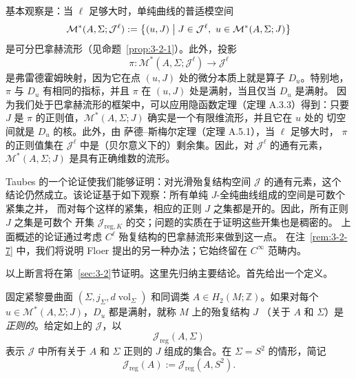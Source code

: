 基本观察是：当 $\ell$ 足够大时，单纯曲线的普适模空间
\[
  \mathcal M^*(A,\Sigma;\mathcal J^\ell)
  :=\bigl\{(u,J)\bigm|
  J\in\mathcal J^\ell,\ u\in\mathcal M^*(A,\Sigma;J)\bigr\}
\]
是可分巴拿赫流形（见命题~\ref{prop:3-2-1}）。此外，投影
\[
  \pi:\mathcal M^*(A,\Sigma;\mathcal J^\ell)
  \longrightarrow\mathcal J^\ell
\]
是弗雷德霍姆映射，因为它在点 $(u,J)$ 处的微分本质上就是算子 $D_u$。特别地，
$\pi$ 与 $D_u$ 有相同的指标，并且 $\pi$ 在 $(u,J)$ 处是满射，当且仅当 $D_u$ 是满射。
因为我们处于巴拿赫流形的框架中，可以应用隐函数定理（定理 A.3.3）得到：只要 $J$ 是
$\pi$ 的正则值，$\mathcal M^*(A,\Sigma;J)$ 确实是一个有限维流形，并且它在 $u$ 处的
切空间就是 $D_u$ 的核。此外，由 萨德--斯梅尔定理（定理 A.5.1），当 $\ell$ 足够大时，
$\pi$ 的正则值集在 $\mathcal J^\ell$ 中是（贝尔意义下的）剩余集。因此，对
$\mathcal J^\ell$ 的通有元素，$\mathcal M^*(A,\Sigma;J)$ 是具有正确维数的流形。

Taubes 的一个论证使我们能够证明：对光滑殆复结构空间 $\mathcal J$ 的通有元素，这个
结论仍然成立。该论证基于如下观察：所有单纯 $J$-全纯曲线组成的空间是可数个紧集之并，
而对每个这样的紧集，相应的正则 $J$ 之集都是开的。因此，所有正则 $J$ 之集是可数个
开集 $\mathcal J_{\mathrm{reg},K}$ 的交；问题的实质在于证明这些开集也是稠密的。
上面概述的论证通过考虑 $C^\ell$ 殆复结构的巴拿赫流形来做到这一点。
在注~\ref{rem:3-2-7} 中，我们将说明 Floer 提出的另一种办法；它始终留在
$C^\infty$ 范畴内。

以上断言将在第~\ref{sec:3-2}节证明。这里先归纳主要结论。首先给出一个定义。

\begin{definition}\label{def:3-1-5}
固定紧黎曼曲面 $(\Sigma,j_\Sigma,d\operatorname{vol}_\Sigma)$ 和同调类
$A\in H_2(M;\mathbb Z)$。如果对每个
$u\in\mathcal M^*(A,\Sigma;J)$，$D_u$ 都是满射，就称 $M$ 上的殆复结构 $J$
（关于 $A$ 和 $\Sigma$）是\emph{正则的}。给定如上的 $\mathcal J$，以
\[
  \mathcal J_{\mathrm{reg}}(A,\Sigma)
\]
表示 $\mathcal J$ 中所有关于 $A$ 和 $\Sigma$ 正则的 $J$ 组成的集合。在
$\Sigma=S^2$ 的情形，简记
\[
  \mathcal J_{\mathrm{reg}}(A)
  :=\mathcal J_{\mathrm{reg}}(A,S^2).
\]
\end{definition}

